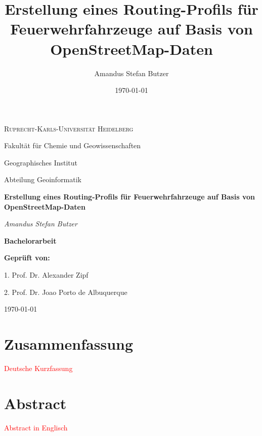 \documentclass[12pt,a4paper]{article}
\author{Amandus Stefan Butzer}
\title{Erstellung eines Routing-Profils für Feuerwehrfahrzeuge auf Basis von OpenStreetMap-Daten}
\date{\today}
\newcommand\todo[1]{\textcolor{red}{#1}}
\begin{document}


\begin{titlepage}
\begin{center}

	{\scshape\LARGE Ruprecht-Karls-Universität Heidelberg\par}
	\vspace{1.0cm}
	{\large Fakultät für Chemie und Geowissenschaften \par Geographisches Institut \par Abteilung Geoinformatik\par}
	\vspace{2.5cm}
	{\Huge\bfseries Erstellung eines Routing-Profils für Feuerwehrfahrzeuge auf Basis von OpenStreetMap-Daten\par}
	\vspace{2cm}
	{\Large\itshape Amandus Stefan Butzer\par}
	\vspace{2cm}
	{\LARGE\bfseries Bachelorarbeit\par}
	
	\vfill
	{\bfseries Geprüft von:}
	{\par 1. Prof. Dr. Alexander Zipf}
	{\par 2. Prof. Dr. Joao Porto de Albuquerque}

	\vfill

	{\large \today\par}
\end{center}
\end{titlepage}

\newpage
{}

{\centering\section*{Zusammenfassung}}
\todo{Deutsche Kurzfassung}\par
\lipsum[23-27]

\newpage
{\centering\section*{Abstract}}
\todo{Abstract in Englisch}
\lipsum[23-27]

\newpage
\tableofcontents

\newpage
\listoffigures
\end{document}
